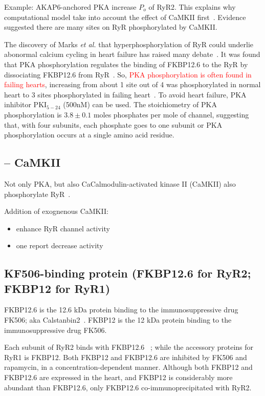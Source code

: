 Example: AKAP6-anchored PKA increase $P_o$ of RyR2.
This explains why computational model take into account the effect of CaMKII
first~\citep{greenstein2002}. Evidence suggested there are many sites on RyR
phosphorylated by CaMKII.
  

The discovery of Marks {\it et al.} that hyperphosphorylation of RyR
could underlie abonormal calcium cycling in heart failure has raised
many debate~\citep{marx2000}. It was found that PKA phosphorylation
regulates the binding of FKBP12.6 to the RyR by dissociating FKBP12.6
from RyR~\citep{Takasago1991}. So,
\textcolor{red}{PKA phosphorylation is often found in failing hearts},
increasing from about 1 site out of 4 was phosphorylated in normal
heart to 3 sites phosphorylated in failing heart~\citep{marx2000}. To
avoid heart failure, PKA inhibitor PKI$_{5-24}$ (500nM) can be
used. The stoichiometry of PKA phosphorylation is $3.8\pm 0.1$ moles
phosphates per mole of channel, suggesting that, with four subunits,
each phosphate goes to one subunit or PKA phosphorylation occurs at a
single amino acid residue.

\subsection{-- CaMKII}
\label{sec:CaMKII-RyR-phosphorylation}

Not only PKA, but also CaCalmodulin-activated kinase II (CaMKII) also
phosphorylate RyR~\citep{Wehrens2004b}. 

Addition of exognenous CaMKII:
\begin{itemize}
  \item enhance RyR channel activity
  \item one report decrease activity~\citep{}
\end{itemize} 



\subsection{KF506-binding protein (FKBP12.6 for RyR2; FKBP12 for RyR1)}
\label{sec:RyR_FKBP}
\label{sec:FKBP}

FKBP12.6 is  the 12.6 kDa protein binding to the immunosuppressive drug FK506;
aka Calstanbin2~\citep{wehrens2003}. FKBP12 is  the 12 kDa protein binding to
the immunosuppressive drug FK506.

Each subunit of RyR2 binds with FKBP12.6 ~\citep{marx2000}; while the accessory
proteins for RyR1 is FKBP12. Both FKBP12 and FKBP12.6 are inhibited by FK506 and
rapamycin, in a concentration-dependent manner.
Although both FKBP12 and FKBP12.6 are expressed in the heart, and FKBP12 is
considerably more abundant than FKBP12.6, only FKBP12.6 co-immunoprecipitated
with RyR2.

